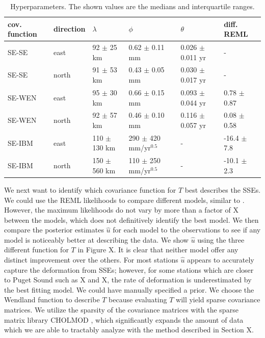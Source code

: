 \documentclass[10pt,a4paper]{article}
\begin{document}
\begin{table}\label{tab:MaterialProperties}
\begin{tabular} {l l l l l l}
cov. function & direction & $\lambda$  & $\phi$   & $\theta$  & diff. REML \\ \hline
SE-SE & east   & 92 $\pm$ 25 km  & 0.62 $\pm$ 0.11 mm  & 0.026 $\pm$ 0.011 yr  &  - \\
SE-SE & north  & 91 $\pm$ 53 km  & 0.43 $\pm$ 0.05 mm  & 0.030 $\pm$ 0.017 yr  &  - \\
SE-WEN & east   & 95 $\pm$ 30 km  & 0.66 $\pm$ 0.15 mm  & 0.093 $\pm$ 0.044 yr &  0.78 $\pm$ 0.87 \\
SE-WEN & north  & 92 $\pm$ 57 km  & 0.46 $\pm$ 0.10 mm  & 0.116 $\pm$ 0.057 yr &  0.08 $\pm$ 0.58 \\
SE-IBM & east   & 110 $\pm$ 130 km & 290 $\pm$ 420 mm/yr$^{0.5}$  & -          & -16.4 $\pm$ 7.8 \\
SE-IBM & north  & 150 $\pm$ 560 km & 110 $\pm$ 250 mm/yr$^{0.5}$ & -           & -10.1 $\pm$ 2.3 \\
\end{tabular}
\caption{Hyperparameters. The shown values are the medians and interquartile ranges.} 
\end{table}

We next want to identify which covariance function for $T$ best describes the SSEs. We could use the REML likelihoods to compare different models, similar to \citet{Langbein2004}. However, the maximum likelihoods do not vary by more than a factor of X between the models, which does not definitively identify the best model. We then compare the posterior estimates $\hat{u}$ for each model to the observations to see if any model is noticeably better at describing the data. We show $\hat{u}$ using the three different function for $T$ in Figure X. It is clear that neither model offer any distinct improvement over the others. For most stations $\hat{u}$ appears to accurately capture the deformation from SSEs; however, for some stations which are closer to Puget Sound such as X and X, the rate of deformation is underestimated by the best fitting model. We could have manually specified a prior. We choose the Wendland function to describe $T$ because evaluating $T$ will yield sparse covariance matrices. We utilize the sparsity of the covariance matrices with the sparse matrix library CHOLMOD \citep{Chen2008}, which significantly expands the amount of data which we are able to tractably analyze with the method described in Section X.   
 
\end{document}
